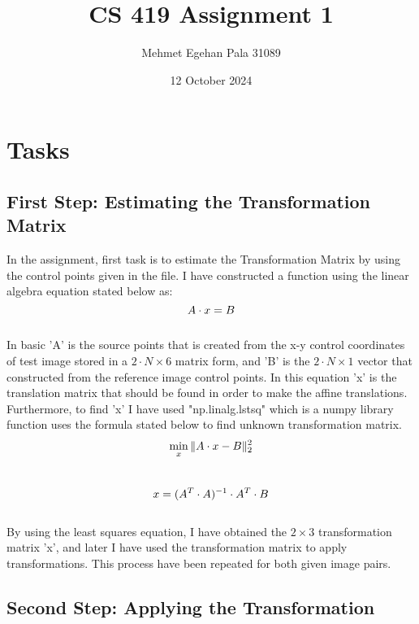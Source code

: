 \documentclass{article}
\title{CS 419 Assignment 1}
\author{Mehmet Egehan Pala 31089 }
\date{12 October 2024}
\begin{document}
\maketitle

\section{Tasks}
\subsection{First Step: Estimating the Transformation Matrix}
\quad In the assignment, first task is to estimate the Transformation Matrix by using the control points given in the file.
I have constructed a function using the linear algebra equation stated below as: \\

\begin{equation}
  \Large {A\cdot x = B}
\end{equation}\\

In basic 'A' is the source points that is created from the x-y control coordinates of test image stored in a $2\cdot N\times 6$ matrix form, and 'B' is the $2\cdot N\times 1$ vector that constructed from the reference image control points. In this equation 'x' is the translation matrix that should be found in order to make the affine translations. Furthermore, to find 'x' I have used "np.linalg.lstsq" which is a numpy library function uses the formula stated below to find unknown transformation matrix.\\

\begin{equation}
  \Large {\min_x \| A\cdot x - B \|_2^2}
\end{equation}\\
\begin{equation}
  \Large {x = (A^T\cdot A)^{-1} \cdot A^T\cdot B}
\end{equation}\\

By using the least squares equation, I have obtained the $2\times 3$ transformation matrix 'x', and later I have used the transformation matrix to apply transformations. This process have been repeated for both given image pairs.\\

\subsection{Second Step: Applying the Transformation}
\end{document}
